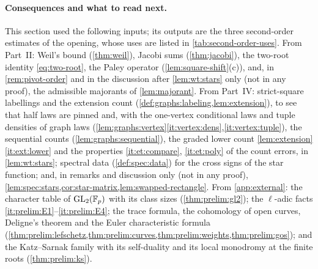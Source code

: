 \paragraph{Consequences and what to read next.}
This section used the following inputs; its outputs are the three second-order estimates of the opening, whose uses are listed in \cref{tab:second-order-uses}.
From Part~II: Weil's bound (\cref{thm:weil}), Jacobi sums (\cref{thm:jacobi}),
the two-root identity \eqref{eq:two-root}, the Paley operator
(\cref{lem:square-shift}(c)), and, in \cref{rem:pivot-order} and in the discussion after \cref{lem:wt:stars} only (not in any proof), the admissible majorants of
\cref{lem:majorant}. From Part~IV: strict-square labellings and the extension
count (\cref{def:graphs:labeling,lem:extension}), to see that half laws are
pinned and, with the one-vertex conditional laws and tuple densities of graph
laws (\cref{lem:graphs:vertex}\ref{it:vertex:dens},\ref{it:vertex:tuple}), the
sequential counts (\cref{lem:graphs:sequential}), the graded lower count
\cref{lem:extension}\ref{it:ext:lower} and the properties
\ref{it:et:compare}, \ref{it:et:poly} of the count errors, in
\cref{lem:wt:stars}; spectral data
(\cref{def:spec:data}) for the cross signs of the star function; and, in remarks and discussion only (not in any proof), \cref{lem:spec:stars,cor:star-matrix,lem:swapped-rectangle}. From
\cref{app:external}: the character table of $\mathrm{GL}_2(\mathbb F_p)$ with its
class sizes (\cref{thm:prelim:gl2}); the $\ell$-adic facts
\ref{it:prelim:E1}--\ref{it:prelim:E4}; the trace formula, the cohomology of
open curves, Deligne's theorem and the Euler characteristic formula
(\cref{thm:prelim:lefschetz,thm:prelim:curves,thm:prelim:weights,thm:prelim:gos});
and the Katz--Sarnak family with its self-duality and its local monodromy at the
finite roots (\cref{thm:prelim:ks}).

